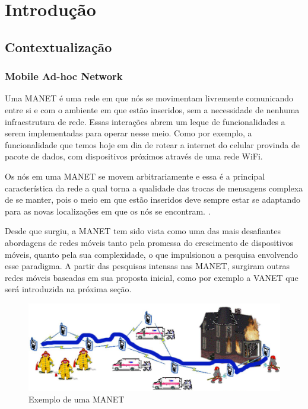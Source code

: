 \documentclass[12pt, %
openright, 
oneside,
a4paper,
brazil]{facom-ufu-abntex2}
\begin{document}
\chapter{Introdução}
\section{Contextualização}
\subsection{Mobile Ad-hoc Network}
Uma \ac{MANET} é uma rede em que nós se movimentam livremente comunicando entre si e com o ambiente em que estão inseridos, sem a necessidade de nenhuma infraestrutura de rede. Essas interações abrem um leque de funcionalidades a serem implementadas para operar nesse meio. Como por exemplo, a funcionalidade que temos hoje em dia de rotear a internet do celular provinda de pacote de dados, com dispositivos próximos através de uma rede \ac{WiFi}.

Os nós em uma \ac{MANET} se movem arbitrariamente e essa é a principal característica da rede a qual torna a qualidade das trocas de mensagens complexa de se manter, pois o meio em que estão inseridos deve sempre estar se adaptando para as novas localizações em que os nós se encontram. \cite{de2002mobile}.

Desde que surgiu, a \ac{MANET} tem sido vista como uma das mais desafiantes abordagens de redes móveis tanto pela promessa do crescimento de dispositivos móveis, quanto pela sua complexidade, o que impulsionou a pesquisa envolvendo esse paradigma. A partir das pesquisas intensas nas \ac{MANET}, surgiram outras redes móveis baseadas em sua proposta inicial, como por exemplo a \ac{VANET} que será introduzida na próxima seção.

\begin{center}
\begin{figure}[hbt]
  \includegraphics[scale=0.48]{manet}
  \caption{Exemplo de uma \ac{MANET}}
\end{figure}
\end{center}
\end{document}
